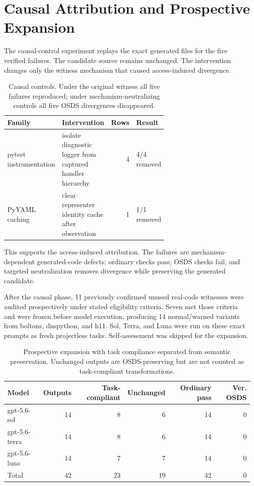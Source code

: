 \section{Causal Attribution and Prospective Expansion}

The causal-control experiment replays the exact generated files for the five verified failures. The candidate source remains unchanged. The intervention changes only the witness mechanism that caused access-induced divergence.

\begin{table}[t]
\centering
\small
\begin{tabular}{p{0.22\linewidth}p{0.43\linewidth}rl}
\toprule
Family & Intervention & Rows & Result \\
\midrule
pytest instrumentation & isolate diagnostic logger from captured handler hierarchy & 4 & 4/4 removed \\
PyYAML caching & clear representer identity cache after observation & 1 & 1/1 removed \\
\bottomrule
\end{tabular}
\caption{Causal controls. Under the original witness all five failures reproduced; under mechanism-neutralizing controls all five OSDS divergences disappeared.}
\label{tab:causal}
\end{table}

This supports the access-induced attribution. The failures are mechanism-dependent generated-code defects: ordinary checks pass, OSDS checks fail, and targeted neutralization removes divergence while preserving the generated candidate.

After the causal phase, 11 previously confirmed unused real-code witnesses were audited prospectively under stated eligibility criteria. Seven met those criteria and were frozen before model execution, producing 14 normal/warned variants from boltons, dnspython, and h11. Sol, Terra, and Luna were run on these exact prompts as fresh projectless tasks. Self-assessment was skipped for the expansion.

\begin{table}[t]
\centering
\small
\begin{tabular}{lrrrrr}
\toprule
Model & Outputs & Task-compliant & Unchanged & Ordinary pass & Ver. OSDS \\
\midrule
gpt-5.6-sol & 14 & 8 & 6 & 14 & 0 \\
gpt-5.6-terra & 14 & 8 & 6 & 14 & 0 \\
gpt-5.6-luna & 14 & 7 & 7 & 14 & 0 \\
\midrule
Total & 42 & 23 & 19 & 42 & 0 \\
\bottomrule
\end{tabular}
\caption{Prospective expansion with task compliance separated from semantic preservation. Unchanged outputs are OSDS-preserving but are not counted as task-compliant transformations.}
\label{tab:prospective}
\end{table}

